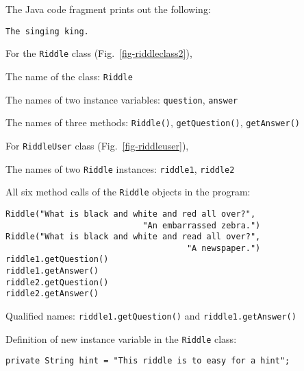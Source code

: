\secANSHleft
\begin{ANS}
\item 
The Java code  fragment prints out the following:


\begin{jjjlisting}
\begin{lstlisting}
The singing king.
\end{lstlisting}
\end{jjjlisting}


\item
For the {\tt Riddle} class (Fig.~\ref{fig-riddleclass2}),

\begin{ANSBL}
\item  The name of the class: {\tt Riddle}
\item  The names of two instance variables: {\tt question}, {\tt answer}
\item  The names of three methods: {\tt Riddle()}, {\tt getQuestion()},
     {\tt getAnswer()}
\end{ANSBL}


\item
For {\tt RiddleUser} class (Fig.~\ref{fig-riddleuser}),

\begin{ANSBL}
\item  The names of two {\tt Riddle} instances: {\tt riddle1},
     {\tt riddle2}
\item  All six method calls of the {\tt Riddle} objects in the program:
\begin{jjjlisting}
\begin{lstlisting}
Riddle("What is black and white and red all over?", 
                            "An embarrassed zebra.")
Riddle("What is black and white and read all over?", 
                                     "A newspaper.")
riddle1.getQuestion()
riddle1.getAnswer()
riddle2.getQuestion()
riddle2.getAnswer()
\end{lstlisting}
\end{jjjlisting}
\item  Qualified names: {\tt riddle1.getQuestion()} and  {\tt riddle1.getAnswer()}
\end{ANSBL}

\item
Definition of new instance variable in the {\tt Riddle} class:

\begin{jjjlisting}
\begin{lstlisting}
private String hint = "This riddle is to easy for a hint";
\end{lstlisting}
\end{jjjlisting}


\end{ANS}
